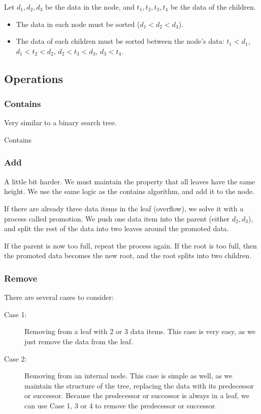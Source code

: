 \documentclass[a4paper]{article}
\begin{document}
\begin{property}
	Let \( d_{1}, d_{2}, d_{3} \) be the data in the node, and \( t_{1}, t_{2}, t_{3}, t_{4} \) be the data of the children.
	\begin{itemize}
		\item The data in each node must be sorted (\( d_{1} < d_{2} < d_{3} \)).
		\item The data of each children must be sorted between the node's data: \( t_{1} < d_{1} \), \( d_{1} < t_{2} < d_{2} \), \( d_{2} < t_{3} < d_{3} \), \( d_{3} < t_{4} \).
	\end{itemize}
\end{property}

\subsection{Operations}

\subsubsection{Contains}
Very similar to a binary search tree.

\begin{algorithm}[H]
	\caption{Contains}
\end{algorithm}

\subsubsection{Add}
A little bit harder. We must maintain the property that all leaves have the same height. We use the same logic as the contains algorithm, and add it to the node. \par
If there are already three data items in the leaf (overflow), we solve it with a process called promotion. We push one data item into the parent (either \( d_{2},d_{3} \)), and split the rest of the data into two leaves around the promoted data. \par
If the parent is now too full, repeat the process again. If the root is too full, then the promoted data becomes the new root, and the root splits into two children.

\subsubsection{Remove}
There are several cases to consider:
\begin{description}
	\item[Case 1:] Removing from a leaf with 2 or 3 data items. This case is very easy, as we just remove the data from the leaf.
	\item[Case 2:] Removing from an internal node. This case is simple as well, as we maintain the structure of the tree, replacing the data with its predecessor or successor. Because the predecessor or successor is always in a leaf, we can use Case 1, 3 or 4 to remove the predecessor or successor.
\end{description}
\end{document}
